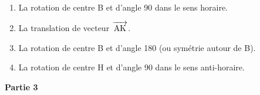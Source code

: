\documentclass[10pt]{article}
\newcommand{\vect}[1]{\overrightarrow{\,\mathstrut#1\,}}
\begin{document}
\begin{enumerate}
\item %
La rotation de centre B et d'angle 90\degres{} dans le sens horaire.
\item %
La translation de vecteur $\vect{\text{AK}}$.
\item %
La rotation de centre B et d'angle 180\degres{} (ou symétrie autour de B).
\item %
La rotation de centre H et d'angle 90\degres{} dans le sens anti-horaire.
\end{enumerate}

\bigskip

\textbf{Partie 3}

\medskip

\end{document}
